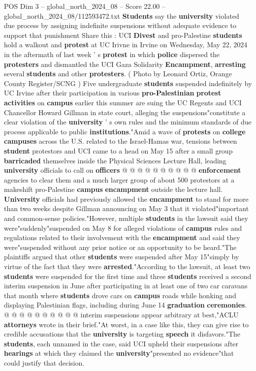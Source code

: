 \begin{textsample}{POS Dim 3 – global\_north\_2024\_08 – Score 22.00 – global\_north\_2024\_08/112593472.txt}  \label{ex:f3_pos_135}
\textbf{Students} say the \textbf{university} violated due process by assigning indefinite suspensions without adequate evidence to support that punishment Share this : UCI \textbf{Divest} and pro-Palestine \textbf{students} hold a walkout and \textbf{protest} at UC Irivne in Irvine on Wednesday, May 22, 2024 in the aftermath of last week ' s \textbf{protest} in which \textbf{police} dispersed the \textbf{protesters} and dismantled the UCI Gaza Solidarity \textbf{Encampment}, \textbf{arresting} several \textbf{students} and other \textbf{protesters}. ( Photo by Leonard Ortiz, Orange County Register/SCNG ) Five undergraduate \textbf{students} suspended indefinitely by UC Irvine after their participation in various \textbf{pro-Palestinian} \textbf{protest} \textbf{activities} on \textbf{campus} earlier this summer are suing the UC Regents and UCI Chancellor Howard Gillman in state court, alleging the suspensions"constitute a clear violation of the \textbf{university} ' s own rules and the minimum standards of due process applicable to public \textbf{institutions}."Amid a wave of \textbf{protests} on \textbf{college} \textbf{campuses} across the U.S. related to the Israel-Hamas war, tensions between \textbf{student} protestors and UCI came to a head on May 15 after a small group \textbf{barricaded} themselves inside the Physical Sciences Lecture Hall, leading \textbf{university} officials to call on \textbf{officers} @ @ @ @ @ @ @ @ @ @ \textbf{enforcement} agencies to clear them and a much larger group of about 500 protestors at a makeshift pro-Palestine \textbf{campus} \textbf{encampment} outside the lecture hall. \textbf{University} officials had previously allowed the \textbf{encampment} to stand for more than two weeks despite Gillman announcing on May 3 that it violated"important and common-sense policies."However, multiple \textbf{students} in the lawsuit said they were"suddenly"suspended on May 8 for alleged violations of \textbf{campus} rules and regulations related to their involvement with the \textbf{encampment} and said they were"suspended without any prior notice or an opportunity to be heard."The plaintiffs argued that other \textbf{students} were suspended after May 15"simply by virtue of the fact that they were \textbf{arrested}."According to the lawsuit, at least two \textbf{students} were suspended for the first time and three \textbf{students} received a second interim suspension in June after participating in at least one of two car caravans that month where \textbf{students} drove cars on \textbf{campus} roads while honking and displaying Palestinian flags, including during June 14 \textbf{graduation} \textbf{ceremonies}. @ @ @ @ @ @ @ @ @ @ interim suspensions appear arbitrary at best,"ACLU \textbf{attorneys} wrote in their brief."At worst, in a case like this, they can give rise to credible accusations that the \textbf{university} is targeting \textbf{speech} it disfavors."The \textbf{students}, each unnamed in the case, said UCI upheld their suspensions after \textbf{hearings} at which they claimed the \textbf{university}"presented no evidence"that could justify that decision.

\end{textsample}
